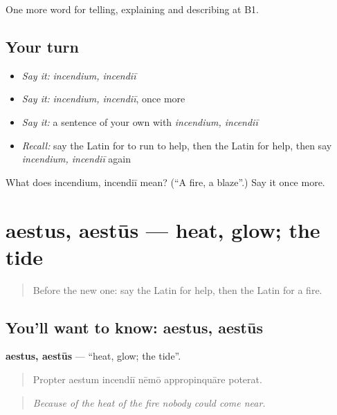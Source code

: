 \begin{grammarlens}[title={What you've built}]
One more word for telling, explaining and describing at B1.
\end{grammarlens}

\subsection*{Your turn}
\begin{itemize}
\raggedright
  \item \emph{Say it:} \emph{incendium, incendiī}
  \item \emph{Say it:} \emph{incendium, incendiī}, once more
  \item \emph{Say it:} a sentence of your own with \emph{incendium, incendiī}
  \item \emph{Recall:} say the Latin for to run to help, then the Latin for help, then say \emph{incendium, incendiī} again
\end{itemize}

\begin{tcolorbox}[breakable,colback=teal!4,colframe=teal!35!black,title={Before you move on}]
What does incendium, incendiī mean? (\textquotedblleft{}A fire, a blaze\textquotedblright{}.) Say it once more.
\end{tcolorbox}
\section[aestus, aestūs]{aestus, aestūs — heat, glow; the tide}

\label{lesson:LA-C317-aestus}



\begin{quote}
Before the new one: say the Latin for help, then the Latin for a fire.
\end{quote}

\subsection*{You'll want to know: aestus, aestūs}
\textbf{aestus, aestūs} — \textquotedblleft{}heat, glow; the tide\textquotedblright{}.

\begin{quote}
Propter aestum incendiī nēmō appropinquāre poterat.
\end{quote}

\begin{quote}
\emph{Because of the heat of the fire nobody could come near.}
\end{quote}

